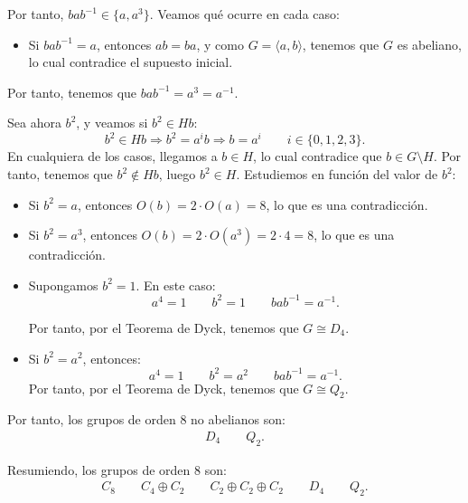 \begin{ejercicio}
\begin{itemize}
        Por tanto, \(ba b^{-1}\in \{a, a^3\}\). Veamos qué ocurre en cada caso:
        \begin{itemize}
            \item Si \(bab^{-1} = a\), entonces \(ab=ba\), y como $G=\langle a, b\rangle$, tenemos que \(G\) es abeliano, lo cual contradice el supuesto inicial.
        \end{itemize}
        Por tanto, tenemos que $bab^{-1}=a^3=a^{-1}$.
    \end{itemize}

    Sea ahora $b^2$, y veamos si $b^2\in Hb$:
    \begin{equation*}
        b^2\in Hb
        \Longrightarrow b^2 = a^ib \Longrightarrow b=a^i \qquad i\in \{0, 1, 2, 3\}.
    \end{equation*}
    En cualquiera de los casos, llegamos a $b\in H$, lo cual contradice que \(b\in G\setminus H\). Por tanto, tenemos que \(b^2\notin Hb\), luego \(b^2\in H\). Estudiemos en función del valor de \(b^2\):
    \begin{itemize}
        \item Si $b^2=a$, entonces $O(b)=2\cdot O(a)=8$, lo que es una contradicción.
        \item Si $b^2=a^3$, entonces $O(b)=2\cdot O(a^3)=2\cdot 4=8$, lo que es una contradicción.
        \item Supongamos $b^2=1$. En este caso:
        \begin{equation*}
            a^4 = 1\qquad
            b^2 = 1\qquad
            bab^{-1} = a^{-1}.
        \end{equation*}

        Por tanto, por el Teorema de Dyck, tenemos que \(G\cong D_4\).
        \item Si $b^2=a^2$, entonces:
        \begin{equation*}
            a^4 = 1\qquad
            b^2 = a^2\qquad
            bab^{-1} = a^{-1}.
        \end{equation*}
        Por tanto, por el Teorema de Dyck, tenemos que \(G\cong Q_2\).
    \end{itemize}

    Por tanto, los grupos de orden \(8\) no abelianos son:
    \begin{gather*}
        D_4 \qquad Q_2.
    \end{gather*}

    Resumiendo, los grupos de orden \(8\) son:
    \begin{gather*}
        C_8 \qquad C_4\oplus C_2 \qquad C_2\oplus C_2\oplus C_2 \qquad D_4 \qquad Q_2.
    \end{gather*}
\end{ejercicio}

